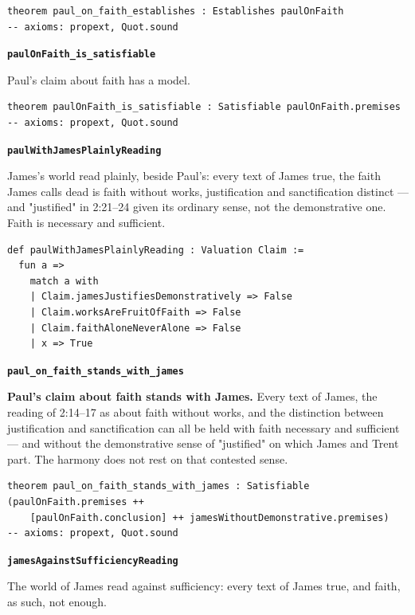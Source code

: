 \documentclass[11pt]{article}
\begin{document}
{\small\begin{verbatim}
theorem paul_on_faith_establishes : Establishes paulOnFaith
-- axioms: propext, Quot.sound
\end{verbatim}}
\par\medskip\noindent\textbf{\texttt{paul\allowbreak{}On\allowbreak{}Faith\_\allowbreak{}is\_\allowbreak{}satisfiable}}\par\nobreak\noindent
Paul's claim about faith has a model.

{\small\begin{verbatim}
theorem paulOnFaith_is_satisfiable : Satisfiable paulOnFaith.premises
-- axioms: propext, Quot.sound
\end{verbatim}}
\par\medskip\noindent\textbf{\texttt{paul\allowbreak{}With\allowbreak{}James\allowbreak{}Plainly\allowbreak{}Reading}}\par\nobreak\noindent
James's world read plainly, beside Paul's: every text of James true, the faith James calls dead is faith without works, justification and sanctification distinct — and "justified" in 2:21–24 given its ordinary sense, not the demonstrative one. Faith is necessary and sufficient.

{\small\begin{verbatim}
def paulWithJamesPlainlyReading : Valuation Claim :=
  fun a =>
    match a with
    | Claim.jamesJustifiesDemonstratively => False
    | Claim.worksAreFruitOfFaith => False
    | Claim.faithAloneNeverAlone => False
    | x => True
\end{verbatim}}
\par\medskip\noindent\textbf{\texttt{paul\_\allowbreak{}on\_\allowbreak{}faith\_\allowbreak{}stands\_\allowbreak{}with\_\allowbreak{}james}}\par\nobreak\noindent
\textbf{Paul's claim about faith stands with James.} Every text of James, the reading of 2:14–17 as about faith without works, and the distinction between justification and sanctification can all be held with faith necessary and sufficient — and without the demonstrative sense of "justified" on which James and Trent part. The harmony does not rest on that contested sense.

{\small\begin{verbatim}
theorem paul_on_faith_stands_with_james : Satisfiable (paulOnFaith.premises ++
    [paulOnFaith.conclusion] ++ jamesWithoutDemonstrative.premises)
-- axioms: propext, Quot.sound
\end{verbatim}}
\par\medskip\noindent\textbf{\texttt{james\allowbreak{}Against\allowbreak{}Sufficiency\allowbreak{}Reading}}\par\nobreak\noindent
The world of James read against sufficiency: every text of James true, and faith, as such, not enough.
\end{document}
